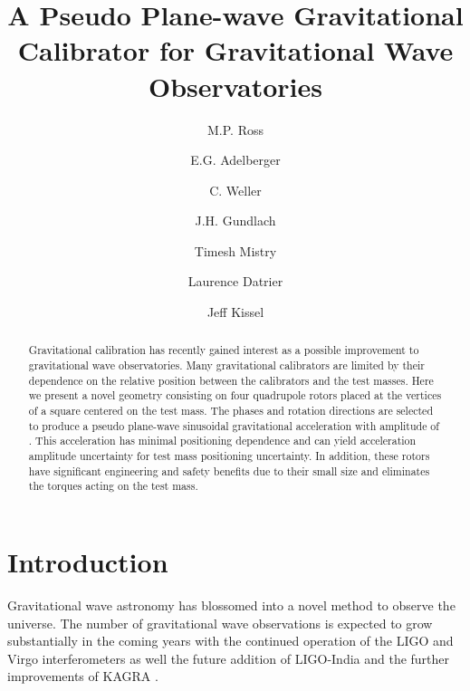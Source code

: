 \documentclass[superscriptaddress, twocolumn, prd]{revtex4-1}
\begin{document}
\title{A Pseudo Plane-wave Gravitational Calibrator for Gravitational Wave Observatories}

\author{M.P. Ross}
\author{E.G. Adelberger}
\author{C. Weller}
\author{J.H. Gundlach}
\author{Timesh Mistry}
\author{Laurence Datrier}
\author{Jeff Kissel}


\begin{abstract}

Gravitational calibration has recently gained interest as a possible improvement to gravitational wave observatories. Many gravitational calibrators are limited by their dependence on the relative position between the calibrators and the test masses. Here we present a novel geometry consisting on four quadrupole rotors placed at the vertices of a square centered on the test mass. The phases and rotation directions are selected to produce a pseudo plane-wave  sinusoidal gravitational acceleration with amplitude of . This acceleration has minimal positioning dependence and can yield  acceleration amplitude uncertainty for \added{$\sim$1 cm} test mass positioning uncertainty. In addition, these rotors have significant engineering and safety benefits due to their small size and eliminates the torques acting on the test mass.

\end{abstract}

\maketitle

\section{Introduction}

Gravitational wave astronomy has blossomed into a novel method to observe the universe. The number of gravitational wave observations is expected to grow substantially in the coming years with the continued operation of the LIGO \cite{aLIGO} and Virgo \cite{virgo} interferometers as well the future addition of LIGO-India \cite{ligo-india} and the further improvements of KAGRA \cite{kagra}. 
\end{document}
